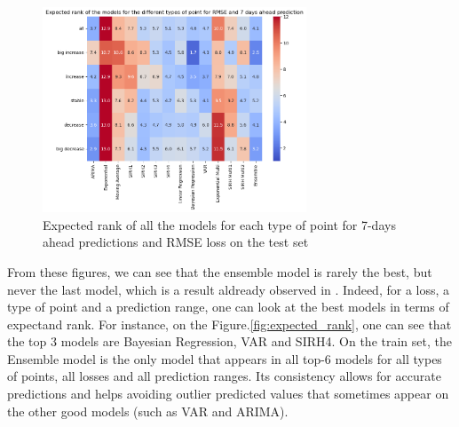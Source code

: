 \begin{figure}
    \centering
    \includegraphics[width=0.7\textwidth]{figures/heatmap_esb_7.png}
    \caption{Expected rank of all the models for each type of point for 7-days ahead predictions and RMSE loss on the test set}
    \label{fig:heatmap_esb_7}
\end{figure}

From these figures, we can see that the ensemble model is rarely the best, but never the last model, which is a result aldready observed in \cite{cramer2022evaluation}.
Indeed, for a loss, a type of point and a prediction range, one can look at the best models in terms of expectand rank.
For instance, on the Figure.\ref{fig:expected_rank}, one can see that the top 3 models are Bayesian Regression, VAR and SIRH4. 
On the train set, the Ensemble model is the only model that appears in all top-6 models for all types of points, all losses and all prediction ranges.
Its consistency allows for accurate predictions and helps avoiding outlier predicted values that sometimes appear on the other good models (such as VAR and ARIMA). 




